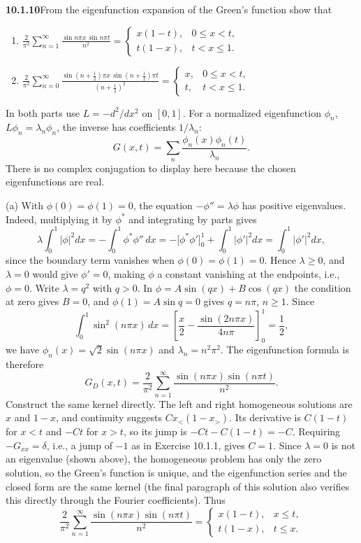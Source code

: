 \par\bigskip
\noindent\textbf{10.1.10}\quad From the eigenfunction expansion of the Green's
function show that
\begin{enumerate}
\item[(a)]
  $\displaystyle\frac{2}{\pi^{2}}\sum_{n=1}^{\infty}
  \frac{\sin n\pi x\,\sin n\pi t}{n^{2}}
  =\begin{cases}
  x(1-t), & 0\le x<t,\\
  t(1-x), & t<x\le 1.
  \end{cases}$
\item[(b)]
  $\displaystyle\frac{2}{\pi^{2}}\sum_{n=0}^{\infty}
  \frac{\sin(n+\frac{1}{2})\pi x\,\sin(n+\frac{1}{2})\pi t}
  {(n+\frac{1}{2})^{2}}
  =\begin{cases}
  x, & 0\le x<t,\\
  t, & t<x\le 1.
  \end{cases}$
\end{enumerate}
\solution
In both parts use $L=-d^2/dx^2$ on $[0,1]$. For a normalized
eigenfunction $\phi_n$, $L\phi_n=\lambda_n\phi_n$, the inverse has
coefficients $1/\lambda_n$:
\[
G(x,t)=\sum_n\frac{\phi_n(x)\phi_n(t)}{\lambda_n}.
\]
There is no complex conjugation to display here because the chosen
eigenfunctions are real.

(a) With $\phi(0)=\phi(1)=0$, the equation $-\phi''=\lambda\phi$
has positive eigenvalues. Indeed, multiplying it by $\phi^*$ and
integrating by parts gives
\[
\lambda\int_0^1|\phi|^2dx
=-\int_0^1\phi^*\phi''\,dx
=-\bigl[\phi^*\phi'\bigr]_0^1+\int_0^1|\phi'|^2dx
=\int_0^1|\phi'|^2dx,
\]
since the boundary term vanishes when $\phi(0)=\phi(1)=0$. Hence
$\lambda\ge0$, and $\lambda=0$ would give $\phi'=0$, making $\phi$ a
constant vanishing at the endpoints, i.e., $\phi=0$. Write
$\lambda=q^2$ with $q>0$. In $\phi=A\sin(qx)+B\cos(qx)$ the condition
at zero gives $B=0$, and $\phi(1)=A\sin q=0$ gives $q=n\pi$, $n\ge1$.
Since
\[
\int_0^1\sin^2(n\pi x)\,dx
=\left[\frac x2-\frac{\sin(2n\pi x)}{4n\pi}\right]_0^1=\frac12,
\]
we have $\phi_n(x)=\sqrt2\sin(n\pi x)$ and $\lambda_n=n^2\pi^2$.
The eigenfunction formula is therefore
\[
G_D(x,t)=\frac2{\pi^2}\sum_{n=1}^\infty
\frac{\sin(n\pi x)\sin(n\pi t)}{n^2}.
\]
Construct the same kernel directly. The left and right homogeneous
solutions are $x$ and $1-x$, and continuity suggests
$C x_<(1-x_>)$. Its derivative is $C(1-t)$ for $x<t$ and $-Ct$ for
$x>t$, so its jump is $-Ct-C(1-t)=-C$. Requiring $-G_{xx}=\delta$,
i.e., a jump of $-1$ as in Exercise 10.1.1, gives $C=1$.
Since $\lambda=0$ is not an eigenvalue (shown above), the homogeneous
problem has only the zero solution, so the Green's function is unique,
and the eigenfunction series and the closed form are the same kernel
(the final paragraph of this solution also verifies this directly
through the Fourier coefficients). Thus
\[
\boxed{\frac2{\pi^2}\sum_{n=1}^\infty
\frac{\sin(n\pi x)\sin(n\pi t)}{n^2}
=\begin{cases}x(1-t),&x\le t,\\t(1-x),&t\le x.\end{cases}}
\]

